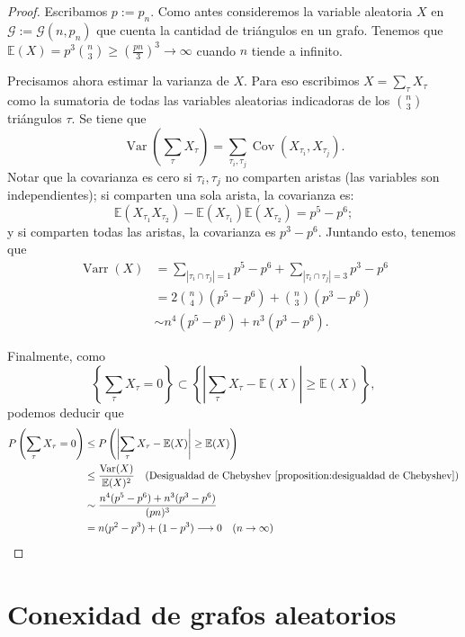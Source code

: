 \documentclass[12pt]{report}
\theoremstyle{plain}
\theoremstyle{definition}
\newcommand{\abs}[1]{\left \vert #1 \right \vert}
\begin{document}
\begin{proof}

Escribamos $p := p_n$. Como antes consideremos la variable aleatoria $X$ en $\mathcal G := \mathcal G (n,p_n)$ que cuenta la cantidad de triángulos en un grafo. Tenemos que $\mathbb{E}(X) = p^3 \binom n 3 \geq \left ( \frac{pn}{3} \right )^3 \rightarrow \infty$ cuando $n$ tiende a infinito.

Precisamos ahora estimar la varianza de $X$. Para eso escribimos $X = \sum_{\tau} X_\tau$ como la sumatoria de todas las variables aleatorias indicadoras de los $\binom n 3$ triángulos $\tau$. Se tiene que
\[
    \operatorname{Var} \left ( \sum_{\tau} X_\tau \right ) = \sum_{\tau_i , \tau_j} \operatorname{Cov} (X_{\tau_i}, X_{\tau_j}).
\]
Notar que la covarianza es cero si $\tau_i, \tau_j$ no comparten aristas (las variables son independientes); si comparten una sola arista, la covarianza es:
\[
    \mathbb{E} (X_{\tau_1} X_{\tau_2}) - \mathbb{E} (X_{\tau_1}) \mathbb{E} (X_{\tau_2}) = p^5 - p^6;
\]
y si comparten todas las aristas, la covarianza es $p^3-p^6$. Juntando esto, tenemos que
\begin{align*}
\operatorname{Varr} (X) &= \sum_{\abs{\tau_i \cap \tau_j} = 1} p^5 - p^6 + \sum_{\abs{\tau_i \cap \tau_j} = 3} p^3 - p^6 \\
&= 2 \binom n 4 (p^5-p^6) + \binom n 3 (p^3 - p^6) \\
&\sim n^4 (p^5-p^6) + n^3 (p^3 - p^6).
\end{align*}

Finalmente, como
\[
    \left \{ \sum_{\tau} X_\tau = 0\right\} \subset \left \{ \abs {\sum_\tau X_\tau - \mathbb{E} (X)}  \geq \mathbb{E} (X) \right\},
\]
podemos deducir que
\begin{align*}
P\left ( \sum_{\tau} X_\tau = 0 \right ) &\leq P \left ( \abs{\sum_\tau X_\tau - \mathbb{E} (X)} \geq \mathbb{E} (X) \right) \\
&\leq \frac{\operatorname{Var} (X)}{\mathbb{E} (X)^2} \quad (\text{Desigualdad de Chebyshev \ref{proposition:desigualdad de Chebyshev}}) \\
&\sim \frac{n^4 (p^5 - p^6) + n^3 (p^3 - p^6)}{(pn)^3} \\
&= n (p^2 - p^3) + (1 - p^3) \longrightarrow 0 \quad (n \to \infty)
\end{align*}
\end{proof}






\section{Conexidad de grafos aleatorios}
\end{document}
